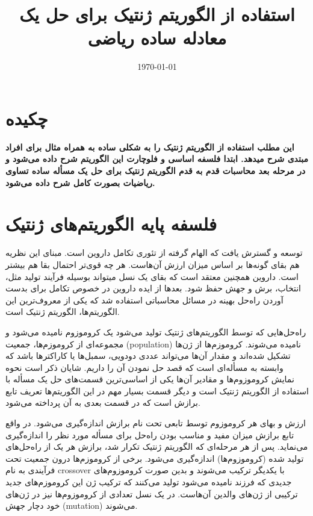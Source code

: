 \documentclass[11pt]{article}
\title{استفاده از الگوریتم ژنتیک برای حل یک معادله ساده ریاضی}
\author{دنی هرماوانتو\\موسسه علوم اندونزی\\آدرس پست الکترونیکی:
\href{denny.hermawanto@gmail.com} }
\date{\today}
\begin{document}
\maketitle

\section{چكيده}
\textbf{این مطلب استفاده از الگوریتم ژنتیک را به شکلی ساده به همراه مثال برای افراد مبتدی شرح میدهد. ابتدا فلسفه اساسی و فلوچارت این الگوریتم شرح داده می‌شود و در مرحله بعد محاسبات قدم به قدم الگوریتم ژنتیک برای حل یک مسأله ساده تساوی ریاضیات بصورت کامل شرح داده می‌شود.}

\section{فلسفه پایه الگوریتم‌های ژنتیک}
توسعه و گسترش یافت که الهام گرفته از تئوری تکامل داروین است. مبنای این نظریه هم بقای گونه‌ها بر اساس میزان ارزش آن‌هاست. هر چه قوی‌تر احتمال بقا هم بیشتر است. داروین همچنین معتقد است که بقای یک نسل میتواند بوسیله فرآیند تولید مثل، انتخاب، برش و جهش حفظ شود. بعدها از ایده داروین در خصوص تکامل برای بدست آوردن راه‌حل بهینه در مسائل محاسباتی استفاده شد که یکی از معروف‌ترین این الگوریتم‌ها، الگوریتم ژنتیک است.

راه‌حل‌هایی که توسط الگوریتم‌های ژنتیک تولید می‌شود یک کروموزوم نامیده می‌شود و مجموعه‌ای از کروموزم‌ها، جمعیت (population) نامیده می‌شوند. کروموزم‌ها از ژن‌ها تشکیل شده‌اند و مقدار آن‌ها می‌تواند عددی دودویی، سمبل‌ها یا کاراکترها باشد که وابسته به مسأله‌ای است که قصد حل نمودن آن را داریم. شایان ذکر است نحوه نمایش کروموزوم‌ها و مقادیر آن‌ها یکی از اساسی‌ترین قسمت‌های حل یک مسأله با استفاده از الگوریتم ژنتیک است و دیگر قسمت بسیار مهم در این الگوریتم‌ها تعریف تابع برازش است که در قسمت بعدی به آن پرداخته می‌شود.

ارزش و بهای هر کروموزوم توسط تابعی تحت نام برازش اندازه‌گیری می‌شود. در واقع تابع برازش میزان مفید و مناسب بودن راه‌حل برای مسأله مورد نظر را اندازه‌گیری می‌نماید. پس از هر مرحله‌ای که الگوریتم ژنتیک تکرار شد، برازش هر یک از راه‌حل‌های تولید شده (کروموزوم‌ها) اندازه‌گیری می‌شود. برخی از کروموزم‌ها درون جمعیت تحت فرآیندی به نام crossover با یکدیگر ترکیب می‌شوند و بدین صورت کروموزوم‌های جدیدی که فرزند نامیده می‌شود تولید می‌کنند که ترکیب ژن این کروموزم‌های جدید ترکیبی از ژن‌های والدین آن‌هاست. در یک نسل تعدادی از کروموزوم‌ها نیز در ژن‌های خود دچار جهش (mutation) می‌شوند.
\end{document}
